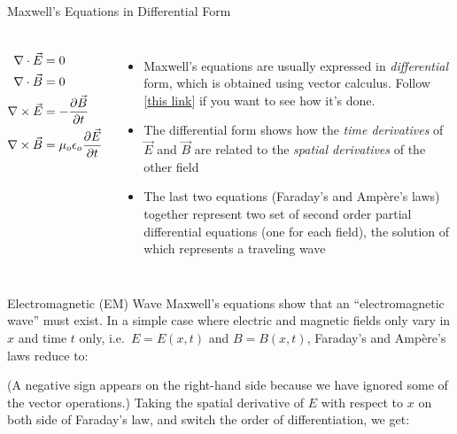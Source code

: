 \documentclass[12pt,aspectratio=169]{beamer}
\begin{document}
\begin{frame}{Maxwell's Equations in Differential Form}
  \begin{columns}
    \large
    \begin{align*}
      \nabla\cdot\vec E &= 0\\
      \nabla\cdot\vec B &= 0\\
      \nabla\times\vec E &=-\diffp{\vec B}t \\
      \nabla\times\vec B &=\mu_o\epsilon_o\diffp{\vec E}t
    \end{align*}

    \begin{itemize}
    \item Maxwell's equations are usually expressed in \emph{differential} form,
      which is obtained using vector calculus. Follow
      [\underline{\href{https://www.wikihow.com/Convert-Maxwell\%27s-Equations-into-Differential-Form}{this link}}] if you want to see how it's done.
    \item The differential form shows how the \emph{time derivatives} of
      $\vec E$ and $\vec B$ are related to the \emph{spatial derivatives}
      of the other field
    \item The last two equations (Faraday's and Amp\`{e}re's laws) together
      represent two set of second order partial differential equations (one for
      each field), the solution of which represents a traveling wave
    \end{itemize}
  \end{columns}
\end{frame}



\begin{frame}{Electromagnetic (EM) Wave}
  Maxwell's equations show that an ``electromagnetic wave'' must exist. In a
  simple case where electric and magnetic fields only vary in $x$ and time $t$
  only, i.e.\ $E=E(x,t)$ and $B=B(x,t)$, Faraday's and Amp\`{e}re's laws reduce
  to:


  (A negative sign appears on the right-hand side because we have ignored some
  of the vector operations.) Taking the spatial derivative of $E$ with respect
  to $x$ on both side of Faraday's law, and switch the order of
  differentiation, we get:

\end{frame}
\end{document}
